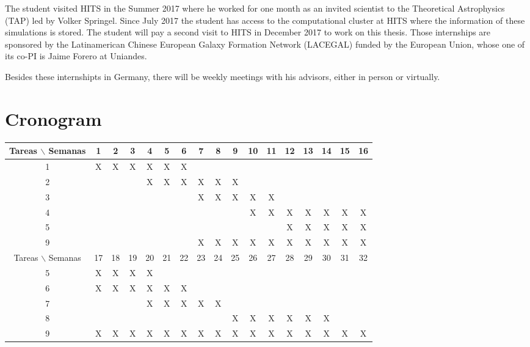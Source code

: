 \documentclass[12pt]{article}
\begin{document}
The student visited HITS in the Summer 2017 where he worked for one month as an invited scientist to the Theoretical Astrophysics (TAP) led by Volker Springel. 
Since July 2017 the student has access to the computational cluster at HITS where the information of these simulations is stored.
The student will pay a second visit to HITS in December 2017 to work on this thesis.
Those internships are sponsored by the Latinamerican Chinese European Galaxy Formation Network (LACEGAL) \cite{LACEGAL} funded by the European Union, whose one of its  co-PI is Jaime Forero at Uniandes.

Besides these internshipts in Germany, there will be weekly meetings with his advisors, either in person or virtually.

\section{Cronogram}

\begin{table}[htb]
	\begin{tabular}{|c|cccccccccccccccc| }
	\hline
	Tareas $\backslash$ Semanas & 1 & 2 & 3 & 4 & 5 & 6 & 7 & 8 & 9 & 10 & 11 & 12 & 13 & 14 & 15 & 16  \\
	\hline
	1 & X & X & X & X & X & X &   &   &   &   &   &   &   &   &   &   \\
	2 &   &   &   & X & X & X & X & X & X &   &   &   &   &   &   &   \\
	3 &   &   &   &   &   &   & X & X & X & X & X &   &   &   &   &   \\
	4 &   &   &   &   &   &   &   &   &   & X & X & X & X & X & X & X \\
	5 &   &   &   &   &   &   &   &   &   &   &   & X & X & X & X & X \\
	9 &   &   &   &   &   &   & X & X & X & X & X & X & X & X & X & X \\

	\hline
	Tareas $\backslash$ Semanas & 17 & 18 & 19 & 20 & 21 & 22 & 23 & 24 & 25 & 26 & 27 & 28 & 29 & 30 & 31 & 32  \\
	\hline
	5 & X & X & X & X &   &   &   &   &   &   &   &   &   &   &   &   \\
	6 & X & X & X & X & X & X &   &   &   &   &   &   &   &   &   &   \\
	7 &   &   &   & X & X & X & X & X &   &   &   &   &   &   &   &   \\
	8 &   &   &   &   &   &   &   &   & X & X & X & X & X & X &   &   \\
	9 & X & X & X & X & X & X & X & X & X & X & X & X & X & X & X & X \\


	\hline
	\end{tabular}
\end{table}
\vspace{1mm}
\end{document}
